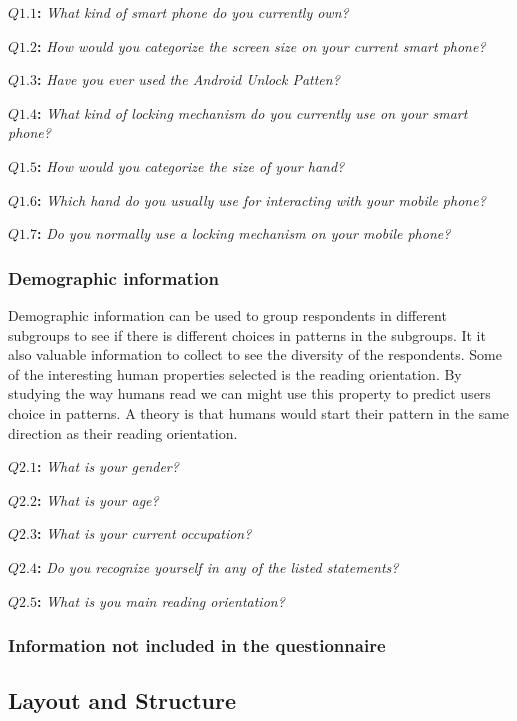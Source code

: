     {\bf $Q1.1$:} {\it What kind of smart phone do you currently own?}

    {\bf $Q1.2$:} {\it How would you categorize the screen size on your current smart phone?}

    {\bf $Q1.3$:} {\it Have you ever used the Android Unlock Patten?}

    {\bf $Q1.4$:} {\it What kind of locking mechanism do you currently use on your smart phone?}

    {\bf $Q1.5$:} {\it How would you categorize the size of your hand?}

    {\bf $Q1.6$:} {\it Which hand do you usually use for interacting with your mobile phone?}

    {\bf $Q1.7$:} {\it Do you normally use a locking mechanism on your mobile phone?}

    \subsubsection*{Demographic information}
    Demographic information can be used to group respondents in different subgroups to see if there is different choices in patterns in the subgroups. It it also valuable information to collect to see the diversity of the respondents. Some of the interesting human properties selected is the reading orientation. By studying the way humans read we can might use this property to predict users choice in patterns. A theory is that humans would start their pattern in the same direction as their reading orientation. 

    {\bf $Q2.1$:} {\it What is your gender?}

    {\bf $Q2.2$:} {\it What is your age?}

    {\bf $Q2.3$:} {\it What is your current occupation?}

    {\bf $Q2.4$:} {\it Do you recognize yourself in any of the listed statements?}

    {\bf $Q2.5$:} {\it What is you main reading orientation?}

    \subsubsection*{Information not included in the questionnaire}
  
  \clearpage
  \subsection{Layout and Structure}\label{sec:layout}

